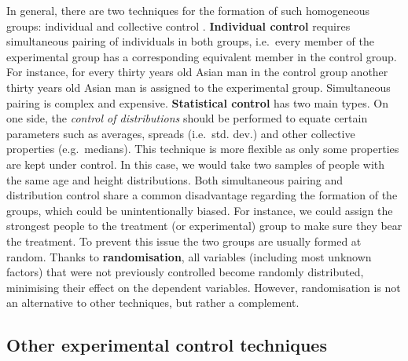 \documentclass[
  12pt,
]{book}
\begin{document}
In general, there are two techniques for the formation of such homogeneous groups: individual and collective control \citep{bunge2017philosophy}. \textbf{Individual control} requires simultaneous pairing of individuals in both groups, i.e.~every member of the experimental group has a corresponding equivalent member in the control group. For instance, for every thirty years old Asian man in the control group another thirty years old Asian man is assigned to the experimental group. Simultaneous pairing is complex and expensive. \textbf{Statistical control} has two main types. On one side, the \emph{control of distributions} should be performed to equate certain parameters such as averages, spreads (i.e.~std. dev.) and other collective properties (e.g.~medians). This technique is more flexible as only some properties are kept under control. In this case, we would take two samples of people with the same age and height distributions. Both simultaneous pairing and distribution control share a common disadvantage regarding the formation of the groups, which could be unintentionally biased. For instance, we could assign the strongest people to the treatment (or experimental) group to make sure they bear the treatment. To prevent this issue the two groups are usually formed at random. Thanks to \textbf{randomisation}, all variables (including most unknown factors) that were not previously controlled become randomly distributed, minimising their effect on the dependent variables. However, randomisation is not an alternative to other techniques, but rather a complement.

\subsection{Other experimental control techniques}\label{other-experimental-control-techniques}
\end{document}
